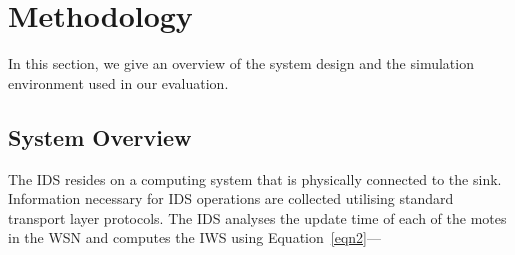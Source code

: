 \documentclass[conference,final]{IEEEtran}
\begin{document}
\section{Methodology}
\label{sec:meth}
In this section, we give an overview of the system design and the simulation environment used in our evaluation. %




\subsection*{System Overview}
\label{subsec:sysdeg}
The IDS resides on a computing system that is physically connected to the sink.
Information necessary for IDS operations are collected utilising standard transport layer protocols. 
The IDS analyses the update time of  each of the motes in the WSN and computes the IWS using Equation~\ref{eqn2}---
\end{document}

